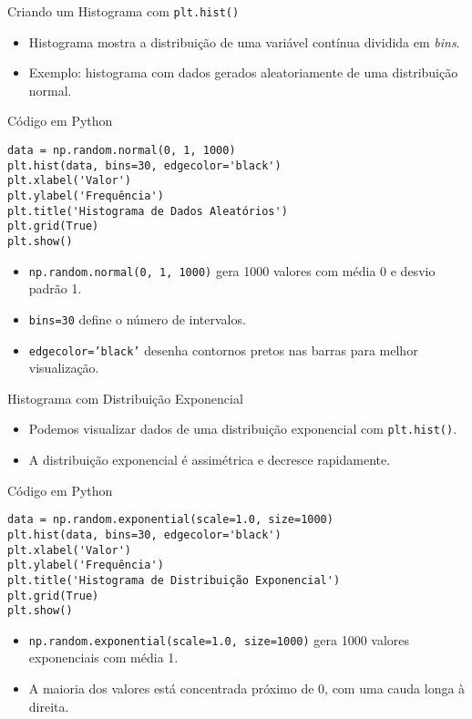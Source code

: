 \begin{frame}[fragile]{Criando um Histograma com \texttt{plt.hist()}}
    \begin{itemize}
        \item Histograma mostra a distribuição de uma variável contínua dividida em \textit{bins}.
        \item Exemplo: histograma com dados gerados aleatoriamente de uma distribuição normal.
    \end{itemize}

    \begin{block}{Código em Python}
        \begin{verbatim}
data = np.random.normal(0, 1, 1000)
plt.hist(data, bins=30, edgecolor='black')
plt.xlabel('Valor')
plt.ylabel('Frequência')
plt.title('Histograma de Dados Aleatórios')
plt.grid(True)
plt.show()
\end{verbatim}
    \end{block}

    \begin{itemize}
        \item \texttt{np.random.normal(0, 1, 1000)} gera 1000 valores com média 0 e desvio padrão 1.
        \item \texttt{bins=30} define o número de intervalos.
        \item \texttt{edgecolor='black'} desenha contornos pretos nas barras para melhor visualização.
    \end{itemize}
\end{frame}

\begin{frame}[fragile]{Histograma com Distribuição Exponencial}
    \begin{itemize}
        \item Podemos visualizar dados de uma distribuição exponencial com \texttt{plt.hist()}.
        \item A distribuição exponencial é assimétrica e decresce rapidamente.
    \end{itemize}

    \begin{block}{Código em Python}
        \begin{verbatim}
data = np.random.exponential(scale=1.0, size=1000)
plt.hist(data, bins=30, edgecolor='black')
plt.xlabel('Valor')
plt.ylabel('Frequência')
plt.title('Histograma de Distribuição Exponencial')
plt.grid(True)
plt.show()
\end{verbatim}
    \end{block}

    \begin{itemize}
        \item \texttt{np.random.exponential(scale=1.0, size=1000)} gera 1000 valores exponenciais com média 1.
        \item A maioria dos valores está concentrada próximo de 0, com uma cauda longa à direita.
    \end{itemize}
\end{frame}

